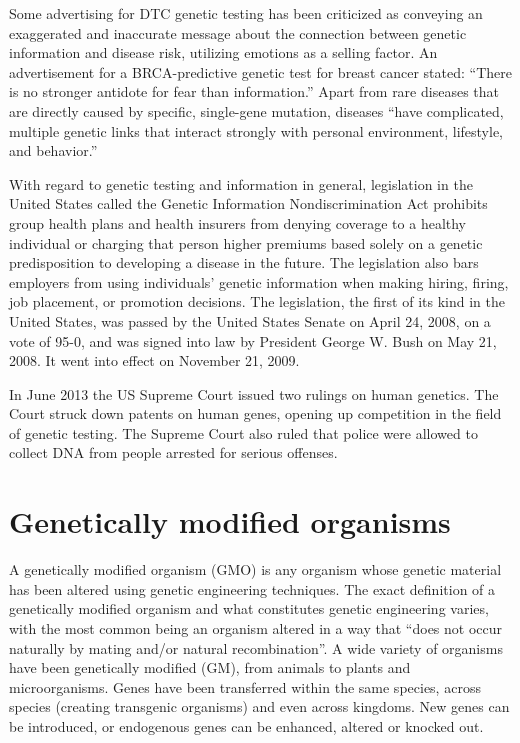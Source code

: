 Some advertising for DTC genetic testing has been criticized as conveying an exaggerated and inaccurate message about the connection between genetic information and disease risk, utilizing emotions as a selling factor. An advertisement for a BRCA-predictive genetic test for breast cancer stated: ``There is no stronger antidote for fear than information.'' Apart from rare diseases that are directly caused by specific, single-gene mutation, diseases ``have complicated, multiple genetic links that interact strongly with personal environment, lifestyle, and behavior.''

With regard to genetic testing and information in general, legislation in the United States called the Genetic Information Nondiscrimination Act prohibits group health plans and health insurers from denying coverage to a healthy individual or charging that person higher premiums based solely on a genetic predisposition to developing a disease in the future. The legislation also bars employers from using individuals' genetic information when making hiring, firing, job placement, or promotion decisions. The legislation, the first of its kind in the United States, was passed by the United States Senate on April 24, 2008, on a vote of 95-0, and was signed into law by President George W. Bush on May 21, 2008. It went into effect on November 21, 2009.

In June 2013 the US Supreme Court issued two rulings on human genetics. The Court struck down patents on human genes, opening up competition in the field of genetic testing. The Supreme Court also ruled that police were allowed to collect DNA from people arrested for serious offenses.

\hypertarget{genetically-modified-organisms}{%
\section{Genetically modified organisms}\label{genetically-modified-organisms}}

A genetically modified organism (GMO) is any organism whose genetic material has been altered using genetic engineering techniques. The exact definition of a genetically modified organism and what constitutes genetic engineering varies, with the most common being an organism altered in a way that ``does not occur naturally by mating and/or natural recombination''. A wide variety of organisms have been genetically modified (GM), from animals to plants and microorganisms. Genes have been transferred within the same species, across species (creating transgenic organisms) and even across kingdoms. New genes can be introduced, or endogenous genes can be enhanced, altered or knocked out.

